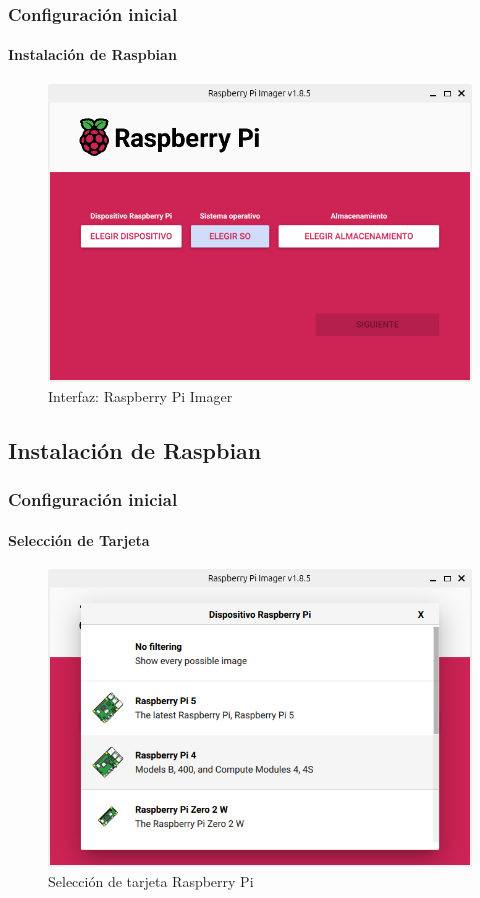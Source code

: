 \documentclass{beamer}
\begin{document}
	\begin{frame}
		\frametitle{Configuración inicial}
		\framesubtitle{Instalación de Raspbian}	
		
		\begin{figure}
			\includegraphics[scale=0.35]{imager.png}
			\caption{Interfaz: Raspberry Pi Imager}
		\end{figure}
		
	\end{frame}
	\subsection{Instalación de Raspbian}
	\begin{frame}
		\frametitle{Configuración inicial}
		\framesubtitle{Selección de Tarjeta}
		
		\begin{figure}
			\includegraphics[scale=0.35]{imager2.png}
			\caption{Selección de tarjeta Raspberry Pi}
		\end{figure}
		
	\end{frame}
	
\end{document}
